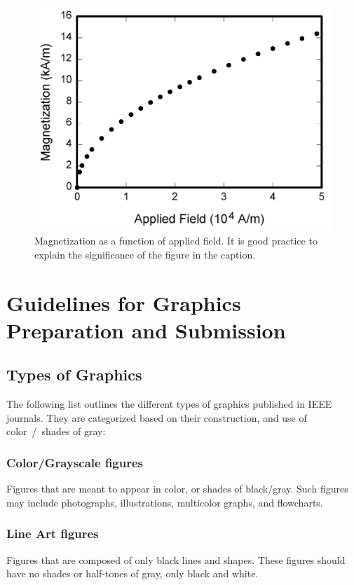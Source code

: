 \documentclass[journal,twoside,web]{ieeecolor}
\begin{document}
\begin{figure}[!t]
    \centerline{\includegraphics[width=\columnwidth]{fig1.png}}
    \caption{Magnetization as a function of applied field.
        It is good practice to explain the significance of the figure in the caption.}
    \label{fig1}
\end{figure}

\section{Guidelines for Graphics Preparation and Submission}
\label{sec:guidelines}

\subsection{Types of Graphics}
The following list outlines the different types of graphics published in
IEEE journals. They are categorized based on their construction, and use of
color~/~shades of gray:

\subsubsection{Color/Grayscale figures}
{Figures that are meant to appear in color, or shades of black/gray. Such
    figures may include photographs, illustrations, multicolor graphs, and
    flowcharts.}

\subsubsection{Line Art figures}
{Figures that are composed of only black lines and shapes. These figures
    should have no shades or half-tones of gray, only black and white.}
\end{document}
